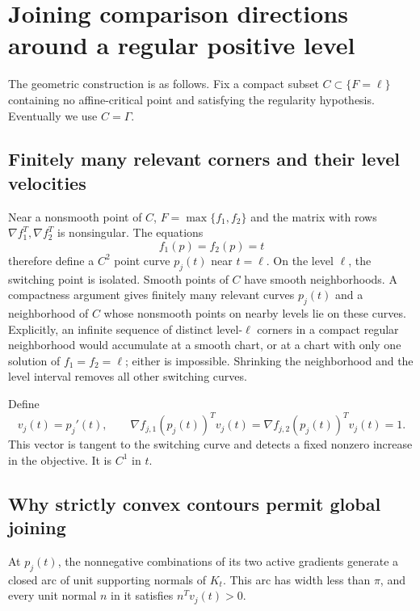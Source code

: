 \section{Joining comparison directions around a regular positive level}
The geometric construction is as follows. Fix a compact subset $C\subset\{F=\ell\}$ containing no affine-critical point and satisfying the regularity hypothesis. Eventually we use $C=\Gamma$.



\subsection{Finitely many relevant corners and their level velocities}
Near a nonsmooth point of $C$, $F=\max\{f_1,f_2\}$ and the matrix with rows $\nabla f_1^T,\nabla f_2^T$ is nonsingular. The equations
\[
 f_1(p)=f_2(p)=t
\]
therefore define a $C^2$ point curve $p_j(t)$ near $t=\ell$. On the level $\ell$, the switching point is isolated. Smooth points of $C$ have smooth neighborhoods. A compactness argument gives finitely many relevant curves $p_j(t)$ and a neighborhood of $C$ whose nonsmooth points on nearby levels lie on these curves. Explicitly, an infinite sequence of distinct level-$\ell$ corners in a compact regular neighborhood would accumulate at a smooth chart, or at a chart with only one solution of $f_1=f_2=\ell$; either is impossible. Shrinking the neighborhood and the level interval removes all other switching curves.

Define
\begin{equation}\label{C:eq:vel}
 v_j(t)=p_j'(t),\qquad
 \nabla f_{j,1}(p_j(t))^Tv_j(t)
 =\nabla f_{j,2}(p_j(t))^Tv_j(t)=1.
\end{equation}
This vector is tangent to the switching curve and detects a fixed nonzero increase in the objective. It is $C^1$ in $t$.



\subsection{Why strictly convex contours permit global joining}

At $p_j(t)$, the nonnegative combinations of its two active gradients generate a closed arc of unit supporting normals of $K_t$. This arc has width less than $\pi$, and every unit normal $n$ in it satisfies $n^Tv_j(t)>0$.

